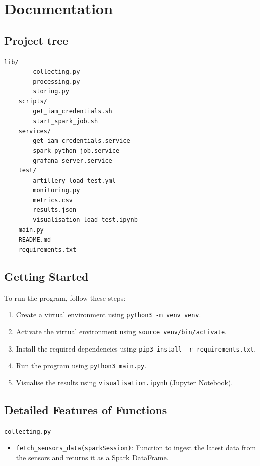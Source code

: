 \documentclass[12pt,oneside]{book} %
\begin{document}



\appendix
\chapter{Documentation}

\begin{subappendices}
    \section{Project tree}
    \begin{lstlisting}[breaklines=true, basicstyle=\small]
    lib/
        collecting.py
        processing.py
        storing.py
    scripts/
        get_iam_credentials.sh
        start_spark_job.sh
    services/
        get_iam_credentials.service
        spark_python_job.service
        grafana_server.service
    test/
        artillery_load_test.yml
        monitoring.py
        metrics.csv
        results.json
        visualisation_load_test.ipynb
    main.py
    README.md
    requirements.txt
    \end{lstlisting}

    \section{Getting Started}
    To run the program, follow these steps:
    \begin{enumerate}
        \itemindent=17.87pt
        \item Create a virtual environment using \texttt{python3 -m venv venv}.
        \item Activate the virtual environment using \texttt{source venv/bin/activate}.
        \item Install the required dependencies using \texttt{pip3 install -r
                  requirements.txt}.
        \item Run the program using \texttt{python3 main.py}.
        \item Visualise the results using \texttt{visualisation.ipynb} (Jupyter Notebook).
    \end{enumerate}

    \section{Detailed Features of Functions}
    \begin{description}
        \item \texttt{collecting.py}
              \begin{itemize}
                  \item \texttt{fetch\_sensors\_data(sparkSession)}: Function to ingest the latest data from the sensors and returns it as a Spark DataFrame.
              \end{itemize}


\end{description}
\end{subappendices}
\end{document}
